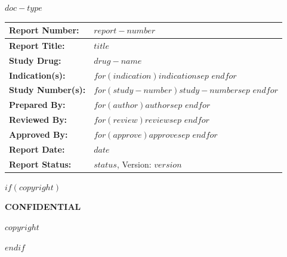 \thispagestyle{empty}
\vskip2cm
{\centerline{\textbf{$doc-type$}}}
\vskip1cm
\begin{table}[!h]
      \setlength{\tabcolsep}{5pt}
      \renewcommand{\arraystretch}{1.5}
      \begin{tabularx}{\textwidth}{|p{}|X|}
            \hline
            \textbf{Report Number:} & $report-number$\\
            \hline
            \textbf{Report Title:} & $title$ \\
            \hline
            \textbf{Study Drug:} &  $drug-name$\\
            \hline
            \textbf{Indication(s):} & $for(indication)$$indication$$sep$ \newline $endfor$\\
            \hline
            \textbf{Study Number(s):} & $for(study-number)$$study-number$$sep$ \newline $endfor$\\
            \hline
            \textbf{Prepared By:} & $for(author)$$author$$sep$ \newline $endfor$\\
            \hline
            \textbf{Reviewed By:} & $for(review)$$review$$sep$ \newline $endfor$ \\
            \hline
            \textbf{Approved By:} & $for(approve)$$approve$$sep$ \newline $endfor$\\
            \hline
            \textbf{Report Date:} & $date$\\
            \hline
            \textbf{Report Status:}  & $status$, Version: $version$\\
            \hline
      \end{tabularx}
\end{table}
\vskip1.5cm
$if(copyright)$
\begin{center}
{\textbf{CONFIDENTIAL}}
\begin{mdframed}
    {\normalsize $copyright$}
\end{mdframed}
\end{center}
$endif$


